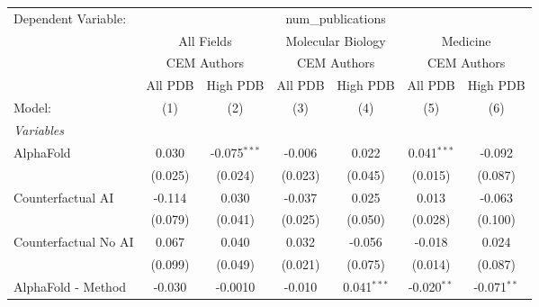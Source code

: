 \begingroup
\centering
\begin{tabular}{lcccccc}
   \tabularnewline \midrule \midrule
   Dependent Variable: & \multicolumn{6}{c}{num\_publications}\\
 & \multicolumn{2}{c}{All Fields} & \multicolumn{2}{c}{Molecular Biology} & \multicolumn{2}{c}{Medicine} \\
\cmidrule(lr){2-3} \cmidrule(lr){4-5} \cmidrule(lr){6-7}
 & \multicolumn{2}{c}{CEM Authors} & \multicolumn{2}{c}{CEM Authors} & \multicolumn{2}{c}{CEM Authors} \\
\cmidrule(lr){2-3} \cmidrule(lr){4-5} \cmidrule(lr){6-7}
 & \multicolumn{1}{c}{All PDB} & \multicolumn{1}{c}{High PDB} & \multicolumn{1}{c}{All PDB} & \multicolumn{1}{c}{High PDB} & \multicolumn{1}{c}{All PDB} & \multicolumn{1}{c}{High PDB} \\
\cmidrule(lr){2-2} \cmidrule(lr){3-3} \cmidrule(lr){4-4} \cmidrule(lr){5-5} \cmidrule(lr){6-6} \cmidrule(lr){7-7}
   Model:                                                     & (1)       & (2)            & (3)           & (4)           & (5)           & (6)\\  
   \midrule
   \emph{Variables}\\
   AlphaFold                                                  & 0.030     & -0.075$^{***}$ & -0.006        & 0.022         & 0.041$^{***}$ & -0.092\\   
                                                              & (0.025)   & (0.024)        & (0.023)       & (0.045)       & (0.015)       & (0.087)\\   
   Counterfactual AI                                          & -0.114    & 0.030          & -0.037        & 0.025         & 0.013         & -0.063\\   
                                                              & (0.079)   & (0.041)        & (0.025)       & (0.050)       & (0.028)       & (0.100)\\   
   Counterfactual No AI                                       & 0.067     & 0.040          & 0.032         & -0.056        & -0.018        & 0.024\\   
                                                              & (0.099)   & (0.049)        & (0.021)       & (0.075)       & (0.014)       & (0.087)\\   
   AlphaFold - Method                                         & -0.030    & -0.0010        & -0.010        & 0.041$^{***}$ & -0.020$^{**}$ & -0.071$^{**}$\\   

\end{tabular}
